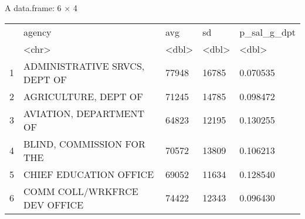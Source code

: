\documentclass[11pt]{article}
\begin{document}
    A data.frame: 6 × 4
\begin{tabular}{r|llll}
  & agency & avg & sd & p\_sal\_g\_dpt\\
  & <chr> & <dbl> & <dbl> & <dbl>\\
\hline
	1 & ADMINISTRATIVE SRVCS, DEPT OF & 77948 & 16785 & 0.070535\\
	2 & AGRICULTURE, DEPT OF          & 71245 & 14785 & 0.098472\\
	3 & AVIATION, DEPARTMENT OF       & 64823 & 12195 & 0.130255\\
	4 & BLIND, COMMISSION FOR THE     & 70572 & 13809 & 0.106213\\
	5 & CHIEF EDUCATION OFFICE        & 69052 & 11634 & 0.128540\\
	6 & COMM COLL/WRKFRCE DEV OFFICE  & 74422 & 12343 & 0.096430\\
\end{tabular}
\end{document}

